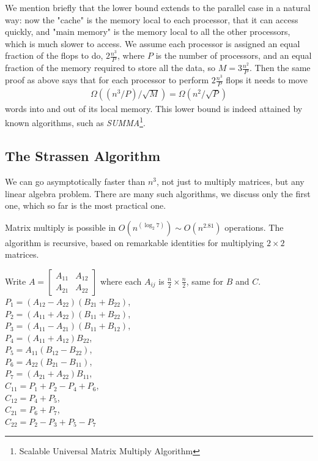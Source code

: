 \documentclass[11pt]{article}
\numberwithin{equation}{section}
\begin{document}
We mention briefly that the lower bound extends to the parallel case in a natural way: now the "cache" is the memory local to each processor, that it can access quickly, 
and "main memory" is the memory local to all the other processors, which is much slower to access. We assume each processor is assigned an equal fraction of the flops to do, 
$2 \frac{n^3}{P}$, where $P$ is the number of processors, and an equal fraction of the memory required to store all the data, so $M = 3 \frac{n^2}{P}$. 
Then the same proof as above says that for each processor to perform $2 \frac{n^3}{P}$ flops it needs to move
\begin{align*}
    \Omega((n^3/P)/\sqrt{M}) = \Omega(n^2/\sqrt{P})
\end{align*}
words into and out of its local memory. This lower bound is indeed attained by known algorithms, such as \textit{SUMMA}\footnote{Scalable Universal Matrix Multiply Algorithm}.

\subsection{The Strassen Algorithm}

We can go asymptotically faster than $n^3$, not just to multiply matrices, but any linear algebra problem. There are many such algorithms,
we discuss only the first one, which so far is the most practical one.

Matrix multiply is possible in $O(n^(\log_2 7)) \sim O(n^{2.81})$ operations. The algorithm is recursive, based on remarkable identities for multiplying $2 \times 2$ matrices.

Write $A=\left[\begin{array}{ll}
    A_{11} & A_{12} \\
    A_{21} & A_{22}
    \end{array}\right]$ where each $A_{ij}$ is $\frac{n}{2} \times \frac{n}{2}$, same for $B$ and $C$.\\
$P_1 = (A_{12}-A_{22})(B_{21}+B_{22})$,\\
$P_2 = (A_{11}+A_{22})(B_{11}+B_{22})$,\\
$P_3 = (A_{11}-A_{21})(B_{11}+B_{12})$,\\
$P_4 = (A_{11}+A_{12})B_{22}$,\\
$P_5 = A_{11}(B_{12}-B_{22})$,\\
$P_6 = A_{22}(B_{21}-B_{11})$,\\
$P_7 = (A_{21}+A_{22})B_{11}$,\\
$C_11 = P_1+P_2-P_4+P_6$,\\
$C_12 = P_4+P_5$,\\
$C_21 = P_6+P_7$,\\
$C_22 = P_2-P_3+P_5-P_7$
\end{document}
